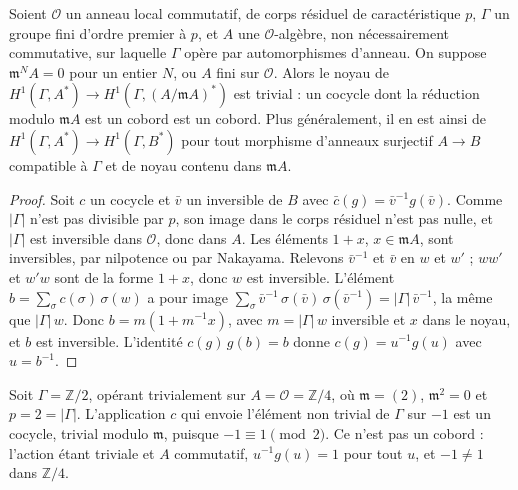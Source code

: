 \begin{encadre}
\begin{enonce}
Soient $\mathcal O$ un anneau local commutatif, de corps résiduel de caractéristique $p$, $\Gamma$ un groupe fini d'ordre premier à $p$, et $A$ une $\mathcal O$-algèbre, non nécessairement commutative, sur laquelle $\Gamma$ opère par automorphismes d'anneau. On suppose $\mathfrak m^N A = 0$ pour un entier $N$, ou $A$ fini sur $\mathcal O$. Alors le noyau de $H^1(\Gamma, A^*) \to H^1(\Gamma, (A/\mathfrak mA)^*)$ est trivial : un cocycle dont la réduction modulo $\mathfrak mA$ est un cobord est un cobord. Plus généralement, il en est ainsi de $H^1(\Gamma, A^*) \to H^1(\Gamma, B^*)$ pour tout morphisme d'anneaux surjectif $A \to B$ compatible à $\Gamma$ et de noyau contenu dans $\mathfrak mA$.
\end{enonce}
\end{encadre}

\begin{proof}
Soit $c$ un cocycle et $\bar v$ un inversible de $B$ avec $\bar c(g) = \bar v^{-1} g(\bar v)$. Comme $|\Gamma|$ n'est pas divisible par $p$, son image dans le corps résiduel n'est pas nulle, et $|\Gamma|$ est inversible dans $\mathcal O$, donc dans $A$. Les éléments $1 + x$, $x \in \mathfrak mA$, sont inversibles, par nilpotence ou par Nakayama. Relevons $\bar v^{-1}$ et $\bar v$ en $w$ et $w'$ ; $ww'$ et $w'w$ sont de la forme $1 + x$, donc $w$ est inversible. L'élément $b = \sum_\sigma c(\sigma)\,\sigma(w)$ a pour image $\sum_\sigma \bar v^{-1}\,\sigma(\bar v)\,\sigma(\bar v^{-1}) = |\Gamma|\,\bar v^{-1}$, la même que $|\Gamma|\, w$. Donc $b = m(1 + m^{-1}x)$, avec $m = |\Gamma|\,w$ inversible et $x$ dans le noyau, et $b$ est inversible. L'identité $c(g)\,g(b) = b$ donne $c(g) = u^{-1} g(u)$ avec $u = b^{-1}$.
\end{proof}

\begin{encadre}
\begin{contrexemple*}
Soit $\Gamma = \mathbb Z/2$, opérant trivialement sur $A = \mathcal O = \mathbb Z/4$, où $\mathfrak m = (2)$, $\mathfrak m^2 = 0$ et $p = 2 = |\Gamma|$. L'application $c$ qui envoie l'élément non trivial de $\Gamma$ sur $-1$ est un cocycle, trivial modulo $\mathfrak m$, puisque $-1 \equiv 1 \pmod 2$. Ce n'est pas un cobord : l'action étant triviale et $A$ commutatif, $u^{-1}g(u) = 1$ pour tout $u$, et $-1 \neq 1$ dans $\mathbb Z/4$.
\end{contrexemple*}
\end{encadre}

